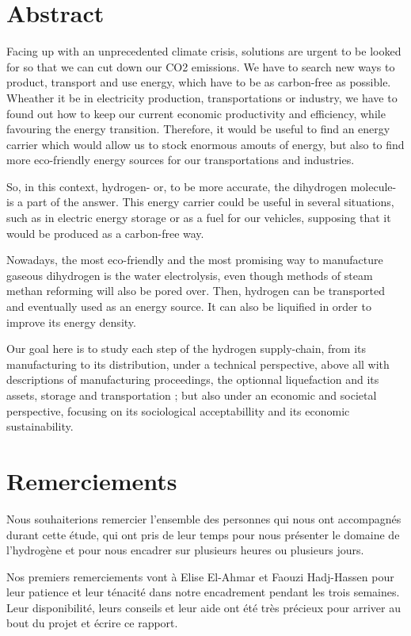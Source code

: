 \documentclass[11pt,french,a4paper]{article}
\begin{document}
\section*{Abstract}
Facing up with an unprecedented climate crisis, solutions are urgent to be looked for so that we can cut down our CO2 emissions. We have to search new ways to product, transport and use energy, which have to be as carbon-free as possible. Wheather it be in electricity production, transportations or industry, we have to found out how to keep our current economic productivity and efficiency, while favouring the energy transition. Therefore, it would be useful to find an energy carrier which would allow us to stock enormous amouts of energy, but also to find more eco-friendly energy sources for our transportations and industries.

So, in this context, hydrogen- or, to be more accurate, the dihydrogen molecule- is a part of the answer. This energy carrier could be useful in several situations, such as in electric energy storage or as a fuel for our vehicles, supposing that it would be produced as a carbon-free way.

Nowadays, the most eco-friendly and the most promising way to manufacture gaseous dihydrogen is the water electrolysis, even though methods of steam methan reforming will also be pored over. Then, hydrogen can be transported and eventually used as an energy source. It can also be liquified in order to improve its energy density.

Our goal here is to study each step of the hydrogen supply-chain, from its manufacturing to its distribution, under a technical perspective, above all with descriptions of manufacturing proceedings, the optionnal liquefaction and its assets, storage and transportation ; but also  under an economic and societal perspective, focusing on its sociological acceptabillity and its economic sustainability.


\section*{Remerciements}
Nous souhaiterions remercier l’ensemble des personnes qui nous ont accompagnés durant cette étude, qui ont pris de leur temps pour nous présenter le domaine de l’hydrogène et pour nous encadrer sur plusieurs heures ou plusieurs jours.

Nos premiers remerciements vont à Elise El-Ahmar et Faouzi Hadj-Hassen pour leur patience et leur ténacité dans notre encadrement pendant les trois semaines. Leur disponibilité, leurs conseils et leur aide ont été très précieux pour arriver au bout du projet et écrire ce rapport. 
\end{document}
